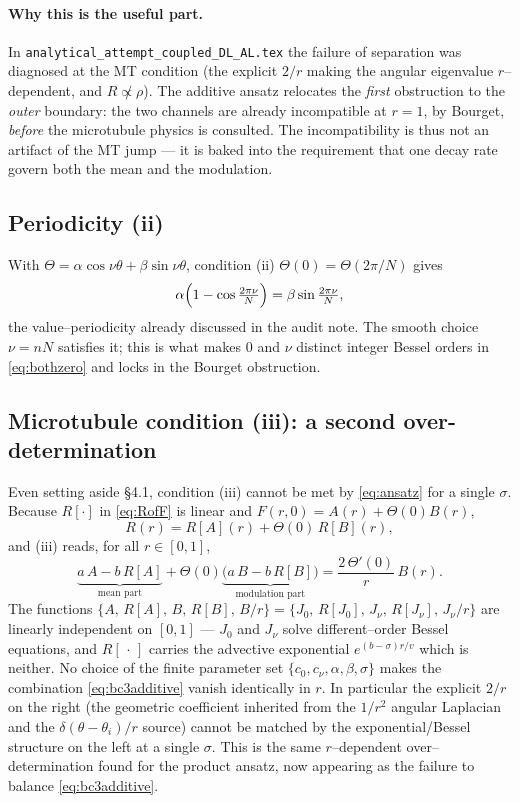 \documentclass{article}
\begin{document}
\paragraph{Why this is the useful part.} In
\texttt{analytical\_attempt\_coupled\_DL\_AL.tex} the failure of separation was
diagnosed at the MT condition (the explicit $2/r$ making the angular eigenvalue
$r$--dependent, and $R\not\propto\rho$). The additive ansatz relocates the
\emph{first} obstruction to the \emph{outer} boundary: the two channels are
already incompatible at $r=1$, by Bourget, \emph{before} the microtubule physics
is consulted. The incompatibility is thus not an artifact of the MT jump --- it
is baked into the requirement that one decay rate govern both the mean and the
modulation.

\subsection{Periodicity (ii)}

With $\Theta=\alpha\cos\nu\theta+\beta\sin\nu\theta$, condition (ii)
$\Theta(0)=\Theta(2\pi/N)$ gives
\begin{equation}
\alpha\Bigl(1-\cos\tfrac{2\pi\nu}{N}\Bigr)=\beta\sin\tfrac{2\pi\nu}{N},
\end{equation}
the value--periodicity already discussed in the audit note. The smooth choice
$\nu=nN$ satisfies it; this is what makes $0$ and $\nu$ distinct integer Bessel
orders in \eqref{eq:bothzero} and locks in the Bourget obstruction.

\subsection{Microtubule condition (iii): a second over-determination}

Even setting aside \S4.1, condition (iii) cannot be met by \eqref{eq:ansatz} for
a single $\sigma$. Because $R[\cdot]$ in \eqref{eq:RofF} is linear and
$F(r,0)=A(r)+\Theta(0)B(r)$,
\begin{equation}
R(r)=R[A](r)+\Theta(0)\,R[B](r),
\end{equation}
and (iii) reads, for all $r\in[0,1]$,
\begin{equation}
\underbrace{a\,A-b\,R[A]}_{\text{mean part}}
+\Theta(0)\underbrace{\bigl(a\,B-b\,R[B]\bigr)}_{\text{modulation part}}
=\frac{2\,\Theta'(0)}{r}\,B(r).
\label{eq:bc3additive}
\end{equation}
The functions $\{A,\,R[A],\,B,\,R[B],\,B/r\}=\{J_0,\,R[J_0],\,J_\nu,\,R[J_\nu],\,
J_\nu/r\}$ are linearly independent on $[0,1]$ --- $J_0$ and $J_\nu$ solve
different--order Bessel equations, and $R[\,\cdot\,]$ carries the advective
exponential $e^{(b-\sigma)r/v}$ which is neither. No choice of the finite
parameter set $\{c_0,c_\nu,\alpha,\beta,\sigma\}$ makes the combination
\eqref{eq:bc3additive} vanish identically in $r$. In particular the explicit
$2/r$ on the right (the geometric coefficient inherited from the $1/r^2$ angular
Laplacian and the $\delta(\theta-\theta_i)/r$ source) cannot be matched by the
exponential/Bessel structure on the left at a single $\sigma$. This is the same
$r$--dependent over--determination found for the product ansatz, now appearing as
the failure to balance \eqref{eq:bc3additive}.
\end{document}
